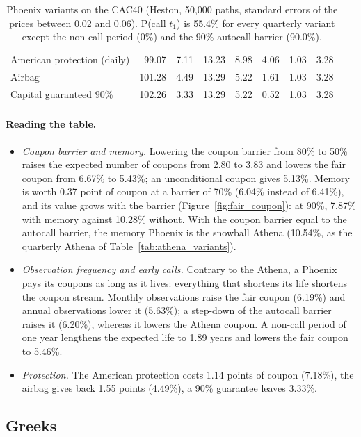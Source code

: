 \documentclass[11pt,a4paper]{article}
\begin{document}
\begin{table}[h]
{\begin{tabular}{@{}lrrrrrrr@{}}
American protection (daily) & 99.07 & 7.11 & 13.23 & 8.98 & 4.06 & 1.03 & 3.28 \\
Airbag & 101.28 & 4.49 & 13.29 & 5.22 & 1.61 & 1.03 & 3.28 \\
Capital guaranteed 90\% & 102.26 & 3.33 & 13.29 & 5.22 & 0.52 & 1.03 & 3.28 \\
\bottomrule
\end{tabular}}
\caption{Phoenix variants on the CAC40 (Heston, 50{,}000 paths, standard errors of the prices between 0.02 and
0.06). P(call $t_1$) is 55.4\% for every quarterly variant except the non-call period (0\%) and the 90\% autocall
barrier (90.0\%).}
\label{tab:phoenix_variants}
\end{table}

\paragraph{Reading the table.}
\begin{itemize}
\item \emph{Coupon barrier and memory.} Lowering the coupon barrier from 80\% to 50\% raises the expected number of
coupons from 2.80 to 3.83 and lowers the fair coupon from 6.67\% to 5.43\%; an unconditional coupon gives 5.13\%.
Memory is worth 0.37 point of coupon at a barrier of 70\% (6.04\% instead of 6.41\%), and its value grows with the
barrier (Figure~\ref{fig:fair_coupon}): at 90\%, 7.87\% with memory against 10.28\% without. With the coupon barrier
equal to the autocall barrier, the memory Phoenix is the snowball Athena (10.54\%, as the quarterly Athena of
Table~\ref{tab:athena_variants}).
\item \emph{Observation frequency and early calls.} Contrary to the Athena, a Phoenix pays its coupons as long as it
lives: everything that shortens its life shortens the coupon stream. Monthly observations raise the fair coupon
(6.19\%) and annual observations lower it (5.63\%); a step-down of the autocall barrier raises it (6.20\%), whereas
it lowers the Athena coupon. A non-call period of one year lengthens the expected life to 1.89 years and lowers the
fair coupon to 5.46\%.
\item \emph{Protection.} The American protection costs 1.14 points of coupon (7.18\%), the airbag gives back 1.55
points (4.49\%), a 90\% guarantee leaves 3.33\%.
\end{itemize}

\subsection{Greeks}
\end{document}
